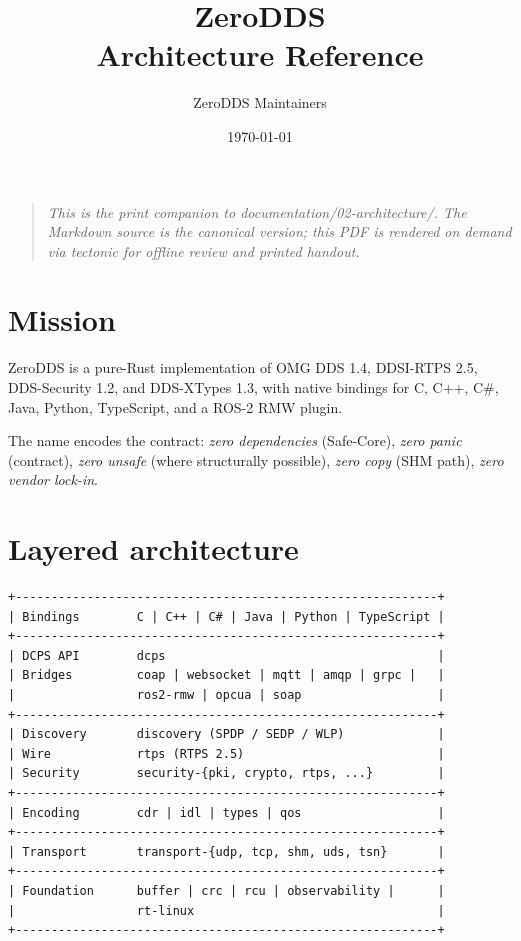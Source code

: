 \documentclass[11pt,a4paper]{article}
\title{\sffamily\bfseries\color{accent}\Huge ZeroDDS\\\Large Architecture Reference}
\author{\sffamily ZeroDDS Maintainers}
\date{\sffamily \today}
\begin{document}
\maketitle
\vspace{1em}

\begin{quote}\itshape
This is the print companion to documentation/02-architecture/.
The Markdown source is the canonical version; this PDF is rendered
on demand via tectonic for offline review and printed handout.
\end{quote}

\tableofcontents
\newpage

\section{Mission}

ZeroDDS is a pure-Rust implementation of OMG DDS 1.4, DDSI-RTPS 2.5,
DDS-Security 1.2, and DDS-XTypes 1.3, with native bindings for
C, C++, C\#, Java, Python, TypeScript, and a ROS-2 RMW plugin.

The name encodes the contract: \emph{zero dependencies} (Safe-Core),
\emph{zero panic} (contract), \emph{zero unsafe} (where structurally
possible), \emph{zero copy} (SHM path), \emph{zero vendor lock-in}.

\section{Layered architecture}

\begin{lstlisting}
+-----------------------------------------------------------+
| Bindings        C | C++ | C# | Java | Python | TypeScript |
+-----------------------------------------------------------+
| DCPS API        dcps                                      |
| Bridges         coap | websocket | mqtt | amqp | grpc |   |
|                 ros2-rmw | opcua | soap                   |
+-----------------------------------------------------------+
| Discovery       discovery (SPDP / SEDP / WLP)             |
| Wire            rtps (RTPS 2.5)                           |
| Security        security-{pki, crypto, rtps, ...}         |
+-----------------------------------------------------------+
| Encoding        cdr | idl | types | qos                   |
+-----------------------------------------------------------+
| Transport       transport-{udp, tcp, shm, uds, tsn}       |
+-----------------------------------------------------------+
| Foundation      buffer | crc | rcu | observability |      |
|                 rt-linux                                  |
+-----------------------------------------------------------+
\end{lstlisting}
\end{document}
